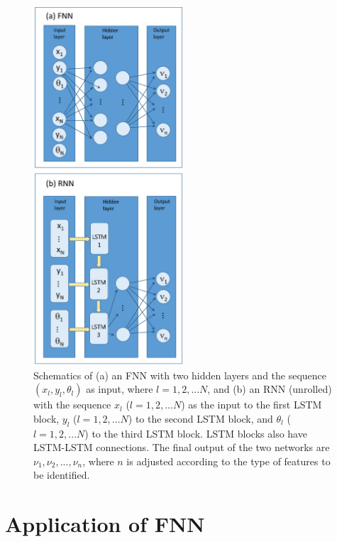\begin{figure}
\centering
\includegraphics[width=0.5\textwidth]{./figs/FIG2.eps}
\caption{Schematics of (a) an FNN with two hidden layers and the sequence $(x_l, y_l, \theta_l)$ as input, where $l=1,2,...N$, and (b)
an RNN (unrolled) with the sequence $x_l$ ($l=1,2,...N$) as the input to the first LSTM block,
$y_l$ ($l=1,2,...N$) to the second LSTM block, and $\theta_l$ ($l=1,2,...N$) to the third LSTM block.
LSTM blocks also have LSTM-LSTM connections.
The final output of the two networks are $\nu_1, \nu_2, ..., \nu_n$, where $n$ is adjusted according to the type of features to be identified.}
\label{FIG2}
\end{figure}



\section{Application of FNN}\label{FNN}

